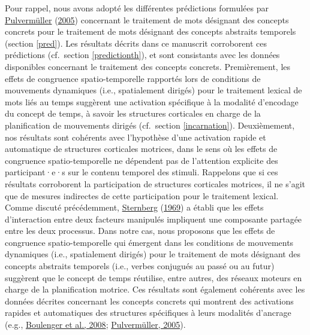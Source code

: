 \documentclass[
  a4paper,12pt,twoside,onecolumn,openright,final,oldfontcommands]{memoir}
\begin{document}
Pour rappel, nous avons adopté les différentes prédictions formulées par \protect\hyperlink{ref-pulvermuller_brain_2005}{Pulvermüller} (\protect\hyperlink{ref-pulvermuller_brain_2005}{2005}) concernant le traitement de mots désignant des concepts concrets pour le traitement de mots désignant des concepts abstraits temporels (section \ref{pred}). Les résultats décrits dans ce manuscrit corroborent ces prédictions (cf.~section \ref{predictionth}), et sont consistants avec les données disponibles concernant le traitement des concepts concrets. Premièrement, les effets de congruence spatio-temporelle rapportés lors de conditions de mouvements dynamiques (i.e., spatialement dirigés) pour le traitement lexical de mots liés au temps suggèrent une activation spécifique à la modalité d'encodage du concept de temps, à savoir les structures corticales en charge de la planification de mouvements dirigés (cf.~section \ref{incarnation}). Deuxièmement, nos résultats sont cohérents avec l'hypothèse d'une activation rapide et automatique de structures corticales motrices, dans le sens où les effets de congruence spatio-temporelle ne dépendent pas de l'attention explicite des participant·e·s sur le contenu temporel des stimuli. Rappelons que si ces résultats corroborent la participation de structures corticales motrices, il ne s'agit que de mesures indirectes de cette participation pour le traitement lexical. Comme discuté précédemment, \protect\hyperlink{ref-sternberg_discovery_1969}{Sternberg} (\protect\hyperlink{ref-sternberg_discovery_1969}{1969}) a établi que les effets d'interaction entre deux facteurs manipulés impliquent une composante partagée entre les deux processus. Dans notre cas, nous proposons que les effets de congruence spatio-temporelle qui émergent dans les conditions de mouvements dynamiques (i.e., spatialement dirigés) pour le traitement de mots désignant des concepts abstraits temporels (i.e., verbes conjugués au passé ou au futur) suggèrent que le concept de temps réutilise, entre autres, des réseaux moteurs en charge de la planification motrice. Ces résultats sont également cohérents avec les données décrites concernant les concepts concrets qui montrent des activations rapides et automatiques des structures spécifiques à leurs modalités d'ancrage (e.g., \protect\hyperlink{ref-boulenger_subliminal_2008}{Boulenger et al., 2008}; \protect\hyperlink{ref-pulvermuller_brain_2005}{Pulvermüller, 2005}).
\end{document}
